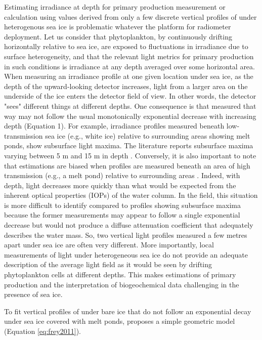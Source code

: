 Estimating irradiance at depth for primary production measurement or calculation using \ked{} values derived from only a few discrete vertical profiles of \edz{} under heterogenous sea ice is problematic whatever the platform for radiometer deployment. Let us consider that phytoplankton, by continuously drifting horizontally relative to sea ice, are exposed to fluctuations in irradiance due to surface heterogeneity, and that the relevant light metrics for primary production in such conditions is irradiance at any depth averaged over some horizontal area. When measuring an irradiance profile at one given location under sea ice, as the depth of the upward-looking detector increases, light from a larger area on the underside of the ice enters the detector field of view. In other words, the detector "sees" different things at different depths. One consequence is that \edz{} measured that way may not follow the usual monotonically exponential decrease with increasing depth (Equation 1). For example, irradiance profiles measured beneath low-transmission sea ice (e.g., white ice) relative to surrounding areas showing melt ponds, show subsurface light maxima. The literature reports subsurface maxima varying between 5 m and 15 m in depth \citep{Frey2011, Katlein2016, Laney2017}. Conversely, it is also important to note that \ked{} estimations are biased when profiles are measured beneath an area of high transmission (e.g., a melt pond) relative to surrounding areas \citep{Katlein2016}. Indeed, with depth, light decreases more quickly than what would be expected from the inherent optical properties (IOPs) of the water column. In the field, this situation is more difficult to identify compared to profiles showing subsurface maxima because the former measurements may appear to follow a single exponential decrease but would not produce a diffuse attenuation coefficient that adequately describes the water mass. So, two vertical light profiles measured a few metres apart under sea ice are often very different. More importantly, local measurements of light under heterogeneous sea ice do not provide an adequate description of the average light field as it would be seen by drifting phytoplankton cells at different depths. This makes estimations of primary production and the interpretation of biogeochemical data challenging in the presence of sea ice.

To fit vertical profiles of \edz{} under bare ice that do not follow an exponential decay under sea ice covered with melt ponds, \citet{Frey2011} proposes a simple geometric model (Equation \ref{eq:frey2011}). 

